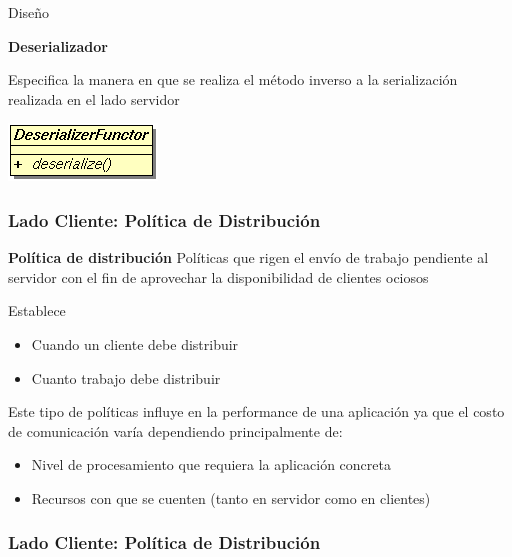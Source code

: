 \begin{subsection}{Diseño}
\begin{frame}
    \textbf{Deserializador}

    Especifica la manera en que se realiza el método inverso a la serialización realizada en el lado servidor

    \begin{center}
        \includegraphics[scale=0.4]{images/deserializer.png}
    \end{center}        

\end{frame}

\begin{frame}\frametitle{Lado Cliente: Política de Distribución}

    \textbf{Política de distribución}
    Políticas que rigen el envío de trabajo pendiente al servidor con el fin de aprovechar la disponibilidad de clientes ociosos

    \pause
    \begin{block}{Establece}
        \begin{itemize}
            \item Cuando un cliente debe distribuir
            \item Cuanto trabajo debe distribuir
        \end{itemize}
    \end{block}

    \pause  
    Este tipo de políticas influye en la performance de una aplicación ya que el costo de comunicación varía dependiendo principalmente
    de:
    \begin{itemize}
        \item   Nivel de procesamiento que requiera la aplicación concreta
        \item   Recursos con que se cuenten (tanto en servidor como en clientes)
    \end{itemize}

\end{frame}

\begin{frame}\frametitle{Lado Cliente: Política de Distribución} %


\end{frame}
\end{subsection}
